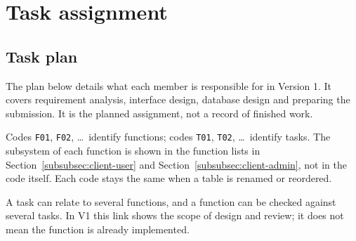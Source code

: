 \section{Task assignment}

\subsection{Task plan}
\label{subsec:task-plan}

The plan below details what each member is responsible for in Version 1. It
covers requirement analysis, interface design, database design and preparing the
submission. It is the planned assignment, not a record of finished work.

Codes \texttt{F01}, \texttt{F02}, \ldots\ identify functions; codes \texttt{T01},
\texttt{T02}, \ldots\ identify tasks. The subsystem of each function is shown in
the function lists in Section~\ref{subsubsec:client-user} and
Section~\ref{subsubsec:client-admin}, not in the code itself.
Each code stays the same when a table is renamed or reordered.

A task can relate to several functions, and a function can be checked against
several tasks. In V1 this link shows the scope of design and review; it does not
mean the function is already implemented.

